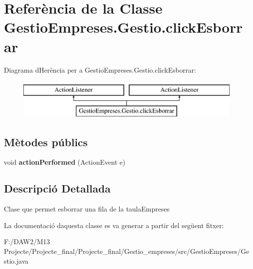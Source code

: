 \hypertarget{class_gestio_empreses_1_1_gestio_1_1click_esborrar}{}\section{Referència de la Classe Gestio\+Empreses.\+Gestio.\+click\+Esborrar}
\label{class_gestio_empreses_1_1_gestio_1_1click_esborrar}
Diagrama d\textquotesingle{}Herència per a Gestio\+Empreses.\+Gestio.\+click\+Esborrar\+:\begin{figure}[H]
\begin{center}
\leavevmode
\includegraphics[height=2.000000cm]{class_gestio_empreses_1_1_gestio_1_1click_esborrar}
\end{center}
\end{figure}
\subsection*{Mètodes públics}
\begin{DoxyCompactItemize}
\item 
\mbox{\label{class_gestio_empreses_1_1_gestio_1_1click_esborrar_a402840944eeff89e86bdd342955ca2c4}} 
void {\bfseries action\+Performed} (Action\+Event e)
\end{DoxyCompactItemize}


\subsection{Descripció Detallada}
Clase que permet esborrar una fila de la taula\+Empreses 

La documentació d\textquotesingle{}aquesta classe es va generar a partir del següent fitxer\+:\begin{DoxyCompactItemize}
\item 
F\+:/\+D\+A\+W2/\+M13 Projecte/\+Projecte\+\_\+final/\+Projecte\+\_\+final/\+Gestio\+\_\+empreses/src/\+Gestio\+Empreses/Gestio.\+java\end{DoxyCompactItemize}
